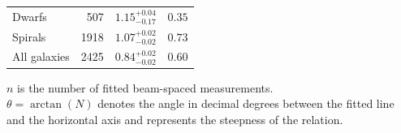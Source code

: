 \begin{table}[p]
\begin{tabular*}{0.76\textwidth}{@{\extracolsep{\fill}}lrrr@{}}
Dwarfs & 507 & $1.15^{+0.04}_{-0.17}$ & $0.35$ \\
Spirals & 1918 & $1.07^{+0.02}_{-0.02}$ & $0.73$ \\
All galaxies & 2425 & $0.84^{+0.02}_{-0.02}$ & $0.60$ \\
\bottomrule
\end{tabular*}
\par\vspace{5pt}
\footnotesize\raggedright
$n$ is the number of fitted beam-spaced measurements.\\
$\theta = \arctan(N)$ denotes the angle in decimal degrees between the fitted line and the horizontal axis and represents the steepness of the relation. 
\par
\endgroup
\end{table}

